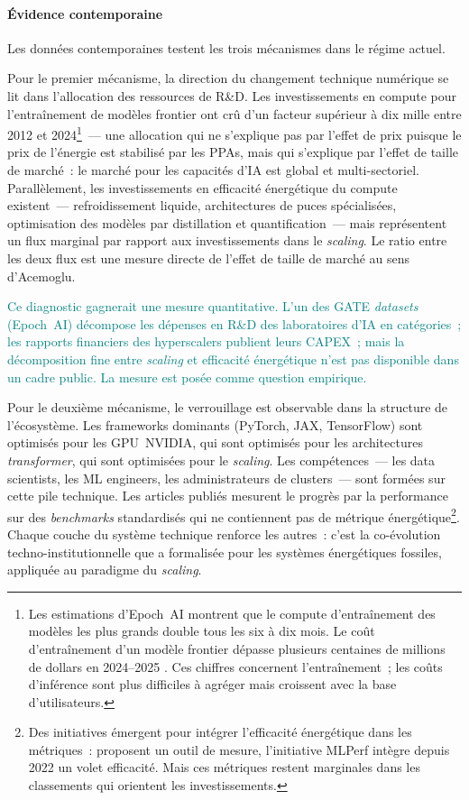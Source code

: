 \paragraph{Évidence contemporaine}

Les données contemporaines testent les trois mécanismes dans le régime actuel.

Pour le premier mécanisme, la direction du changement technique numérique se lit dans l'allocation des ressources de R\&D. Les investissements en compute pour l'entraînement de modèles frontier ont crû d'un facteur supérieur à dix mille entre 2012 et 2024\footnote{Les estimations d'Epoch~AI montrent que le compute d'entraînement des modèles les plus grands double tous les six à dix mois. Le coût d'entraînement d'un modèle frontier dépasse plusieurs centaines de millions de dollars en 2024--2025 \parencite{cottier_rapid_2025}. Ces chiffres concernent l'entraînement~; les coûts d'inférence sont plus difficiles à agréger mais croissent avec la base d'utilisateurs.}~--- une allocation qui ne s'explique pas par l'effet de prix puisque le prix de l'énergie est stabilisé par les PPAs, mais qui s'explique par l'effet de taille de marché~: le marché pour les capacités d'IA est global et multi-sectoriel. Parallèlement, les investissements en efficacité énergétique du compute existent~--- refroidissement liquide, architectures de puces spécialisées, optimisation des modèles par distillation et quantification~--- mais représentent un flux marginal par rapport aux investissements dans le \emph{scaling}. Le ratio entre les deux flux est une mesure directe de l'effet de taille de marché au sens d'Acemoglu.

\textcolor{teal}{Ce diagnostic gagnerait une mesure quantitative. L'un des GATE \emph{datasets} (Epoch~AI) décompose les dépenses en R\&D des laboratoires d'IA en catégories~; les rapports financiers des hyperscalers publient leurs CAPEX~; mais la décomposition fine entre \emph{scaling} et efficacité énergétique n'est pas disponible dans un cadre public. La mesure est posée comme question empirique.}

Pour le deuxième mécanisme, le verrouillage est observable dans la structure de l'écosystème. Les frameworks dominants (PyTorch, JAX, TensorFlow) sont optimisés pour les GPU~NVIDIA, qui sont optimisés pour les architectures \emph{transformer}, qui sont optimisées pour le \emph{scaling}. Les compétences~--- les data scientists, les ML engineers, les administrateurs de clusters~--- sont formées sur cette pile technique. Les articles publiés mesurent le progrès par la performance sur des \emph{benchmarks} standardisés qui ne contiennent pas de métrique énergétique\footnote{Des initiatives émergent pour intégrer l'efficacité énergétique dans les métriques~: \textcite{henderson_towards_2020} proposent un outil de mesure, l'initiative MLPerf intègre depuis 2022 un volet efficacité. Mais ces métriques restent marginales dans les classements qui orientent les investissements.}. Chaque couche du système technique renforce les autres~: c'est la co-évolution techno-institutionnelle que \textcite{unruh_understanding_2000} a formalisée pour les systèmes énergétiques fossiles, appliquée au paradigme du \emph{scaling}.

